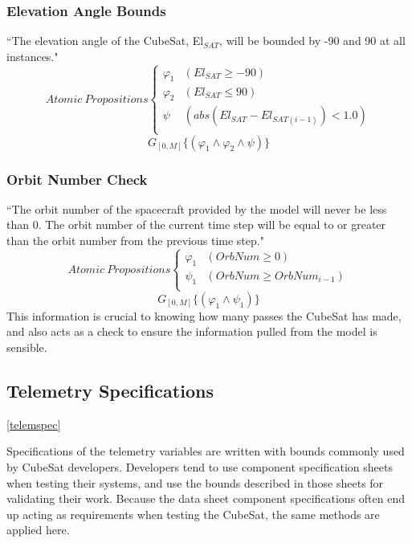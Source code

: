 \documentclass[conf]{new-aiaa}
\begin{document}
\subsubsection{\textbf{Elevation Angle Bounds}}
“The elevation angle of the CubeSat, El$_{SAT}$, will be bounded by -90 and 90 at all instances."
\[ Atomic\:Propositions \begin{cases}
  \varphi_1 & (El_{SAT} \geq -90) \\
  \varphi_2 & (El_{SAT} \leq 90) \\
  \psi & (abs(El_{SAT} - El_{SAT(i-1)}) < 1.0) \\
\end{cases} \]
\begin{equation}
    \label{Spec 3}
    G_{[0,M]} \{(\varphi_1 \wedge \varphi_2 \wedge \psi)\}
\end{equation} 

\subsubsection{\textbf{Orbit Number Check}}
“The orbit number of the spacecraft provided by the model will never be less than 0. The orbit number of the current time step will be equal to or greater than the orbit number from the previous time step."
\[ Atomic\:Propositions \begin{cases}
  \varphi_1 & (OrbNum \geq 0) \\
  \psi_1 & (OrbNum \geq OrbNum_{i-1})\\
\end{cases} \]
\begin{equation}
    \label{Spec 4}
    G_{[0,M]} \{(\varphi_1 \wedge \psi_1)\}
\end{equation} 
This information is crucial to knowing how many passes the CubeSat has made, and also acts as a check to ensure the information pulled from the model is sensible.

\subsection{Telemetry Specifications}
\ref{telemspec}

Specifications of the telemetry variables are written with bounds commonly used by CubeSat developers. Developers tend to use component specification sheets when testing their systems, and use the bounds described in those sheets for validating their work. Because the data sheet component specifications often end up acting as requirements when testing the CubeSat, the same methods are applied here.%
\end{document}
